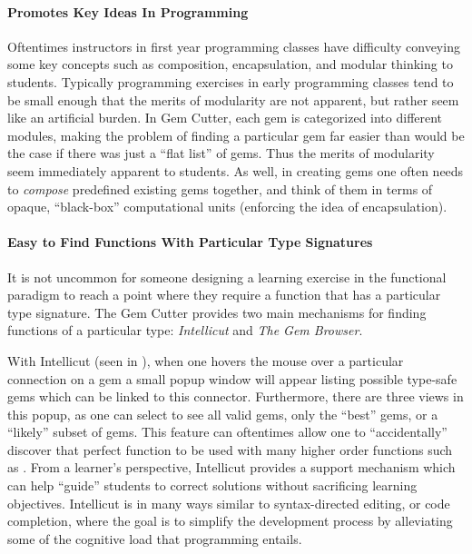\paragraph{Promotes Key Ideas In Programming}

Oftentimes instructors in first year programming classes have difficulty conveying some key concepts such as composition, encapsulation, and modular thinking to students.  Typically programming exercises in early programming classes tend to be small enough that the merits of modularity are not apparent, but rather seem like an artificial burden.  In Gem Cutter, each gem is categorized into different modules, making the problem of finding a particular gem far easier than would be the case if there was just a ``flat list'' of gems.  Thus the merits of modularity seem immediately apparent to students.  As well, in creating gems one often needs to \emph{compose} predefined existing gems together, and think of them in terms of opaque, ``black-box'' computational units (enforcing the idea of encapsulation).

\paragraph{Easy to Find Functions With Particular Type Signatures}

It is not uncommon for someone designing a learning exercise in the functional paradigm to reach a point where they require a function that has a particular type signature.  The Gem Cutter provides two main mechanisms for finding functions of a particular type: \emph{Intellicut} and \emph{The Gem Browser}.  

With Intellicut (seen in ), when one hovers the mouse over a particular connection on a gem a small popup window will appear listing possible type-safe gems which can be linked to this connector.  Furthermore, there are three views in this popup, as one can select to see all valid gems, only the ``best'' gems, or a ``likely'' subset of gems.  This feature can oftentimes allow one to ``accidentally'' discover that perfect function to be used with many higher order functions such as .  From a learner's perspective, Intellicut provides a support mechanism which can help ``guide'' students to correct solutions without sacrificing learning objectives.  Intellicut is in many ways similar to syntax-directed editing, or code completion, where the goal is to simplify the development process by alleviating some of the cognitive load that programming entails.

